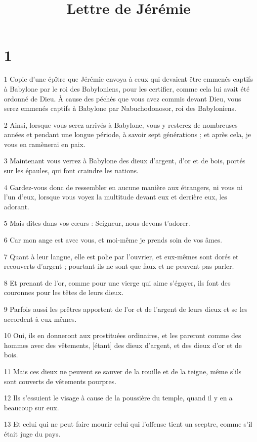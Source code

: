 

\title{Lettre de Jérémie}

\chapter{1}


\par 1 Copie d'une épître que Jérémie envoya à ceux qui devaient être emmenés captifs à Babylone par le roi des Babyloniens, pour les certifier, comme cela lui avait été ordonné de Dieu. À cause des péchés que vous avez commis devant Dieu, vous serez emmenés captifs à Babylone par Nabuchodonosor, roi des Babyloniens.
\par 2 Ainsi, lorsque vous serez arrivés à Babylone, vous y resterez de nombreuses années et pendant une longue période, à savoir sept générations ; et après cela, je vous en ramènerai en paix.
\par 3 Maintenant vous verrez à Babylone des dieux d'argent, d'or et de bois, portés sur les épaules, qui font craindre les nations.
\par 4 Gardez-vous donc de ressembler en aucune manière aux étrangers, ni vous ni l'un d'eux, lorsque vous voyez la multitude devant eux et derrière eux, les adorant.
\par 5 Mais dites dans vos cœurs : Seigneur, nous devons t'adorer.
\par 6 Car mon ange est avec vous, et moi-même je prends soin de vos âmes.
\par 7 Quant à leur langue, elle est polie par l'ouvrier, et eux-mêmes sont dorés et recouverts d'argent ; pourtant ils ne sont que faux et ne peuvent pas parler.
\par 8 Et prenant de l'or, comme pour une vierge qui aime s'égayer, ils font des couronnes pour les têtes de leurs dieux.
\par 9 Parfois aussi les prêtres apportent de l'or et de l'argent de leurs dieux et se les accordent à eux-mêmes.
\par 10 Oui, ils en donneront aux prostituées ordinaires, et les pareront comme des hommes avec des vêtements, [étant] des dieux d'argent, et des dieux d'or et de bois.
\par 11 Mais ces dieux ne peuvent se sauver de la rouille et de la teigne, même s'ils sont couverts de vêtements pourpres.
\par 12 Ils s'essuient le visage à cause de la poussière du temple, quand il y en a beaucoup sur eux.
\par 13 Et celui qui ne peut faire mourir celui qui l'offense tient un sceptre, comme s'il était juge du pays.
